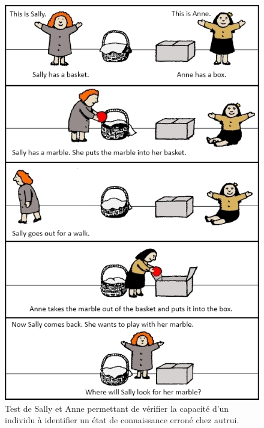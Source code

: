 \documentclass[a4paper,11pt,twoside]{StyleThese}
\begin{document}
\begin{figure}[ht!]
 \centering
  \includegraphics[width=0.89\linewidth]{./img/sally.jpg} 
  \caption {Test de Sally et Anne permettant de vérifier la capacité d'un individu à identifier un état de connaissance erroné chez autrui.}
  \label{fig:sallyAndAnne}
\end{figure}


\end{document}
